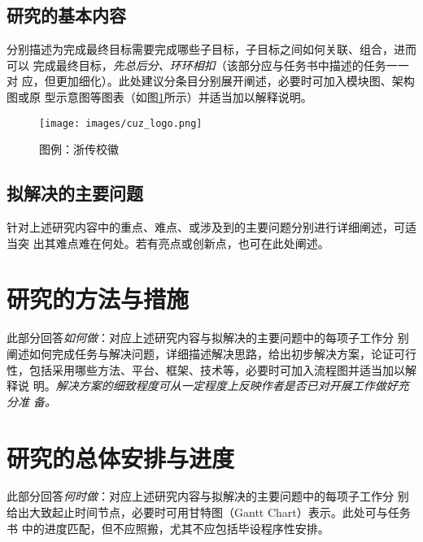\subsection{研究的基本内容}

\begin{tcolorbox}
	分别描述为完成最终目标需要完成哪些子目标，子目标之间如何关联、组合，进而可以
	完成最终目标，\emph{先总后分、环环相扣}（该部分应与任务书中描述的任务一一对
	应，但更加细化）。此处建议分条目分别展开阐述，必要时可加入模块图、架构图或原
	型示意图等图表（如图\ref*{fig:1}所示）并适当加以解释说明。
\end{tcolorbox}
\begin{figure}[h]
	\centering
	\texttt{[image: images/cuz\_logo.png]}
	\caption{图例：浙传校徽}
	\label{fig:1}
\end{figure}

\subsection{拟解决的主要问题}

\begin{tcolorbox}
	针对上述研究内容中的重点、难点、或涉及到的主要问题分别进行详细阐述，可适当突
	出其难点难在何处。若有亮点或创新点，也可在此处阐述。
\end{tcolorbox}

\section{研究的方法与措施}

\begin{tcolorbox}
	此部分回答\emph{如何做}：对应上述研究内容与拟解决的主要问题中的每项子工作分
	别阐述如何完成任务与解决问题，详细描述解决思路，给出初步解决方案，论证可行
	性，包括采用哪些方法、平台、框架、技术等，必要时可加入流程图并适当加以解释说
	明。\emph{解决方案的细致程度可从一定程度上反映作者是否已对开展工作做好充分准
		备。}
\end{tcolorbox}

\section{研究的总体安排与进度}

\begin{tcolorbox}
	此部分回答\emph{何时做}：对应上述研究内容与拟解决的主要问题中的每项子工作分
	别给出大致起止时间节点，必要时可用甘特图（Gantt Chart）表示。此处可与任务书
	中的进度匹配，但不应照搬，尤其不应包括毕设程序性安排。
\end{tcolorbox}

